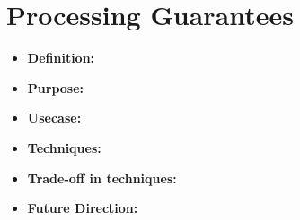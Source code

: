 \section{Processing Guarantees}

\begin{itemize}
	\item \textbf{Definition: } 
	\item \textbf{Purpose: } 
	\item \textbf{Usecase:}
	\item \textbf{Techniques: }
	\item \textbf{Trade-off in techniques: } 
	\item \textbf{Future Direction:} 
\end{itemize}